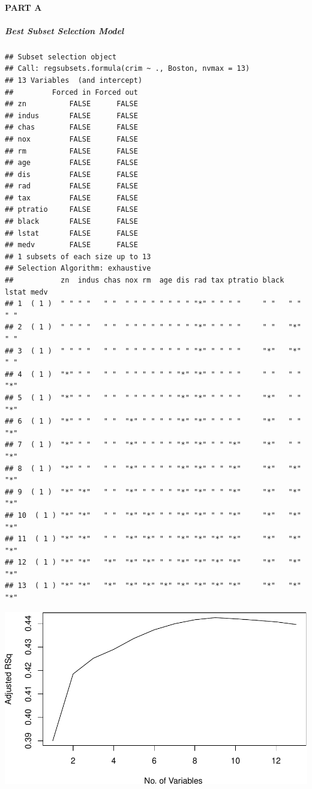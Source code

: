 \documentclass[
]{article}
\begin{document}
\hypertarget{part-a-3}{%
\paragraph{\texorpdfstring{{PART A}}{PART A}}\label{part-a-3}}

\hypertarget{best-subset-selection-model}{%
\subparagraph{\texorpdfstring{\textbf{Best Subset Selection
Model}}{Best Subset Selection Model}}\label{best-subset-selection-model}}

\begin{verbatim}
## Subset selection object
## Call: regsubsets.formula(crim ~ ., Boston, nvmax = 13)
## 13 Variables  (and intercept)
##         Forced in Forced out
## zn          FALSE      FALSE
## indus       FALSE      FALSE
## chas        FALSE      FALSE
## nox         FALSE      FALSE
## rm          FALSE      FALSE
## age         FALSE      FALSE
## dis         FALSE      FALSE
## rad         FALSE      FALSE
## tax         FALSE      FALSE
## ptratio     FALSE      FALSE
## black       FALSE      FALSE
## lstat       FALSE      FALSE
## medv        FALSE      FALSE
## 1 subsets of each size up to 13
## Selection Algorithm: exhaustive
##           zn  indus chas nox rm  age dis rad tax ptratio black lstat medv
## 1  ( 1 )  " " " "   " "  " " " " " " " " "*" " " " "     " "   " "   " " 
## 2  ( 1 )  " " " "   " "  " " " " " " " " "*" " " " "     " "   "*"   " " 
## 3  ( 1 )  " " " "   " "  " " " " " " " " "*" " " " "     "*"   "*"   " " 
## 4  ( 1 )  "*" " "   " "  " " " " " " "*" "*" " " " "     " "   " "   "*" 
## 5  ( 1 )  "*" " "   " "  " " " " " " "*" "*" " " " "     "*"   " "   "*" 
## 6  ( 1 )  "*" " "   " "  "*" " " " " "*" "*" " " " "     "*"   " "   "*" 
## 7  ( 1 )  "*" " "   " "  "*" " " " " "*" "*" " " "*"     "*"   " "   "*" 
## 8  ( 1 )  "*" " "   " "  "*" " " " " "*" "*" " " "*"     "*"   "*"   "*" 
## 9  ( 1 )  "*" "*"   " "  "*" " " " " "*" "*" " " "*"     "*"   "*"   "*" 
## 10  ( 1 ) "*" "*"   " "  "*" "*" " " "*" "*" " " "*"     "*"   "*"   "*" 
## 11  ( 1 ) "*" "*"   " "  "*" "*" " " "*" "*" "*" "*"     "*"   "*"   "*" 
## 12  ( 1 ) "*" "*"   "*"  "*" "*" " " "*" "*" "*" "*"     "*"   "*"   "*" 
## 13  ( 1 ) "*" "*"   "*"  "*" "*" "*" "*" "*" "*" "*"     "*"   "*"   "*"
\end{verbatim}

\begin{center}\includegraphics{Disha_Gandhi_Take_Home_Exam_PDF_files/figure-latex/unnamed-chunk-58-1} \end{center}
\end{document}
